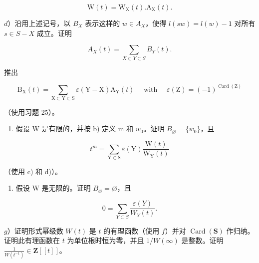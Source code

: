 \[
\mathrm{W} (t) = \mathrm{W} _ {\mathrm{X}} (t). \mathrm{A} _ {\mathrm{X}} (t).
\]

\(d\)）沿用上述记号，以 \(B_{X}\) 表示这样的 \(w\in A_X\)，使得 \(l(sw) = l(w) - 1\) 对所有 \(s\in S - X\) 成立。证明

\[
A _ {X} (t) = \sum_ {X \subset Y \subset S} B _ {Y} (t).
\]

推出

\[
\mathrm{B} _ {\mathrm{X}} (t) = \sum_ {\mathrm{X} \subset \mathrm{Y} \subset \mathrm{S}} \varepsilon (\mathrm{Y} - \mathrm{X}) \mathrm{A} _ {\mathrm{Y}} (t) \quad \text { with } \quad \varepsilon (\mathrm{Z}) = (- 1) ^ {\operatorname{Card} (\mathrm{Z})}
\]

（使用习题 25）。

\begin{enumerate}
\def\labelenumi{\alph{enumi})}
\setcounter{enumi}{4}
\tightlist
\item
  假设 W 是有限的，并按 b) 定义 m 和 \(w_{0}\)。证明 \(B_{\varnothing} = \{w_{0}\}\)，且
\end{enumerate}

\[
t ^ {m} = \sum_ {\mathrm{Y} \subset \mathrm{S}} \varepsilon (\mathrm{Y}) \frac {\mathrm{W} (t)}{\mathrm{W} _ {\mathrm{Y}} (t)}
\]

（使用 c) 和 d)）。

\begin{enumerate}
\def\labelenumi{\alph{enumi})}
\setcounter{enumi}{5}
\tightlist
\item
  假设 W 是无限的。证明 \(B_{\varnothing} = \varnothing\)，且
\end{enumerate}

\[
0 = \sum_ {Y \subset S} \frac {\varepsilon (Y)}{W _ {Y} (t)}.
\]

\(g\)）证明形式幂级数 \(W(t)\) 是 \(t\) 的有理函数（使用 \(f\)）并对 \(\operatorname{Card}(\mathbf{S})\) 作归纳。证明此有理函数在 \(t\) 为单位根时恒为零，并且 \(1 / W(\infty)\) 是整数。证明 \(\frac{1}{W(t^{-1})} \in \mathbf{Z}[[t]]\)。

